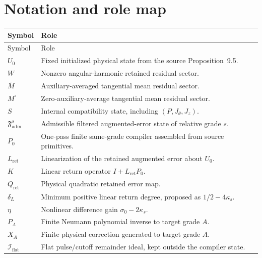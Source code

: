 \documentclass[11pt]{article}
\numberwithin{equation}{section}
\theoremstyle{highend}
\theoremstyle{definition}
\newcommand{\Fadm}{\mathfrak F_{\mathrm{adm}}}
\newcommand{\Qret}{Q_{\mathrm{ret}}}
\newcommand{\Iflat}{\mathcal I_{\mathrm{flat}}}
\begin{document}
\appendix
\section{Notation and role map}\label{app:notation}
\begin{longtable}{@{}p{}p{}@{}}
\toprule
Symbol & Role \\
\midrule
\endfirsthead
\toprule
Symbol & Role \\
\midrule
\endhead
$U_0$ & Fixed initialized physical state from the source Proposition~9.5. \\
$W$ & Nonzero angular-harmonic retained residual sector. \\
$\bar M$ & Auxiliary-averaged tangential mean residual sector. \\
$M^\circ$ & Zero-auxiliary-average tangential mean residual sector. \\
$S$ & Internal compatibility state, including $(P,J_\theta,J_z)$. \\
$\Fadm^s$ & Admissible filtered augmented-error state of relative grade $s$. \\
$P_0$ & One-pass finite same-grade compiler assembled from source primitives. \\
$L_{\mathrm{ret}}$ & Linearization of the retained augmented error about $U_0$. \\
$K$ & Linear return operator $I+L_{\mathrm{ret}}P_0$. \\
$\Qret$ & Physical quadratic retained error map. \\
$\delta_L$ & Minimum positive linear return degree, proposed as $1/2-4\kappa_s$. \\
$\eta$ & Nonlinear difference gain $\sigma_0-2\kappa_s$. \\
$P_A$ & Finite Neumann polynomial inverse to target grade $A$. \\
$X_A$ & Finite physical correction generated to target grade $A$. \\
$\Iflat$ & Flat pulse/cutoff remainder ideal, kept outside the compiler state. \\
\bottomrule
\end{longtable}
\end{document}
